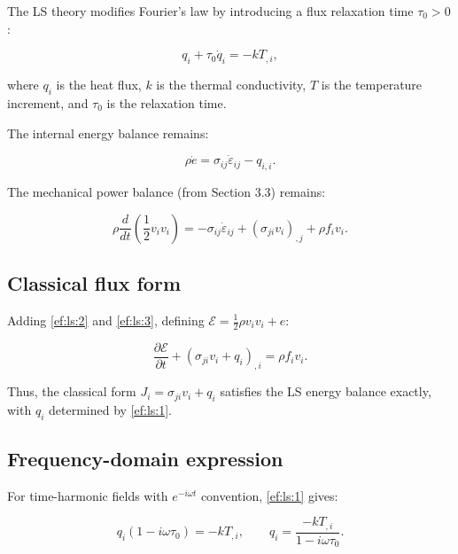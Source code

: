 \documentclass{article}
\begin{document}
The LS theory modifies Fourier's law by introducing a flux relaxation time $\tau_0 > 0$:

\begin{equation}
q_i + \tau_0 \dot{q}_i = -k T_{,i},
\label{ef:ls:1}
\end{equation}

where $q_i$ is the heat flux, $k$ is the thermal conductivity, $T$ is the temperature increment, and $\tau_0$ is the relaxation time.

The internal energy balance remains:

\begin{equation}
\rho \dot{e} = \sigma_{ij}\dot{\varepsilon}_{ij} - q_{i,i}.
\label{ef:ls:2}
\end{equation}

The mechanical power balance (from Section 3.3) remains:

\begin{equation}
\rho \frac{d}{dt}\left(\frac{1}{2}v_i v_i\right)
= -\sigma_{ij}\dot{\varepsilon}_{ij} + (\sigma_{ji}v_i)_{,j} + \rho f_i v_i.
\label{ef:ls:3}
\end{equation}

\subsection{Classical flux form}

Adding \eqref{ef:ls:2} and \eqref{ef:ls:3}, defining $\mathcal{E} = \frac{1}{2}\rho v_i v_i + e$:

\begin{equation}
\frac{\partial\mathcal{E}}{\partial t} + (\sigma_{ji}v_i + q_i)_{,i} = \rho f_i v_i.
\label{ef:ls:4}
\end{equation}

Thus, the classical form $J_i = \sigma_{ji}v_i + q_i$ satisfies the LS energy balance exactly, with $q_i$ determined by \eqref{ef:ls:1}.

\subsection{Frequency-domain expression}

For time-harmonic fields with $e^{-i\omega t}$ convention, \eqref{ef:ls:1} gives:

\begin{equation}
q_i(1 - i\omega\tau_0) = -k T_{,i},
\qquad
q_i = \frac{-k T_{,i}}{1 - i\omega\tau_0}.
\label{ef:ls:5}
\end{equation}
\end{document}
